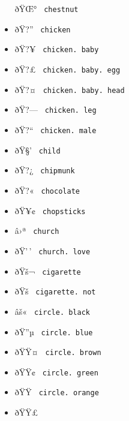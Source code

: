 \begin{itemize}
  \label{symbol-chestnut}{{ ðŸŒ° } \texttt{\ chestnut\ }}
\item
  \label{symbol-chicken}{{ ðŸ?'' } \texttt{\ chicken\ }}
\item
  \label{symbol-chicken.baby}{{ ðŸ?¥ }
  \texttt{\ chicken.\ baby\ }}
\item
  \label{symbol-chicken.baby.egg}{{ ðŸ?£ }
  \texttt{\ chicken.\ baby.\ egg\ }}
\item
  \label{symbol-chicken.baby.head}{{ ðŸ?¤ }
  \texttt{\ chicken.\ baby.\ head\ }}
\item
  \label{symbol-chicken.leg}{{ ðŸ?--- }
  \texttt{\ chicken.\ leg\ }}
\item
  \label{symbol-chicken.male}{{ ðŸ?{}`` }
  \texttt{\ chicken.\ male\ }}
\item
  \label{symbol-child}{{ ðŸ§' } \texttt{\ child\ }}
\item
  \label{symbol-chipmunk}{{ ðŸ?¿ } \texttt{\ chipmunk\ }}
\item
  \label{symbol-chocolate}{{ ðŸ?« }
  \texttt{\ chocolate\ }}
\item
  \label{symbol-chopsticks}{{ ðŸ¥¢ }
  \texttt{\ chopsticks\ }}
\item
  \label{symbol-church}{{ â›ª } \texttt{\ church\ }}
\item
  \label{symbol-church.love}{{ ðŸ'\,' }
  \texttt{\ church.\ love\ }}
\item
  \label{symbol-cigarette}{{ ðŸš¬ }
  \texttt{\ cigarette\ }}
\item
  \label{symbol-cigarette.not}{{ ðŸš­ }
  \texttt{\ cigarette.\ not\ }}
\item
  \label{symbol-circle.black}{{ âš« }
  \texttt{\ circle.\ black\ }}
\item
  \label{symbol-circle.blue}{{ ðŸ''µ }
  \texttt{\ circle.\ blue\ }}
\item
  \label{symbol-circle.brown}{{ ðŸŸ¤ }
  \texttt{\ circle.\ brown\ }}
\item
  \label{symbol-circle.green}{{ ðŸŸ¢ }
  \texttt{\ circle.\ green\ }}
\item
  \label{symbol-circle.orange}{{ ðŸŸ }
  \texttt{\ circle.\ orange\ }}
\item
  \label{symbol-circle.purple}{{ ðŸŸ£ }
}
\end{itemize}
